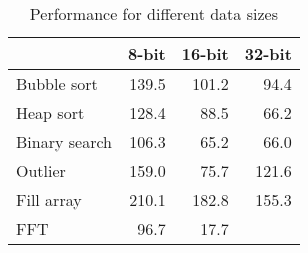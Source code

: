 
\begin{table}
\caption{Performance for different data sizes}
\label{tbl-performance-8-16-32-bit}
    \begin{tabular}{lrrr}
    \toprule
                   &   8-bit  &  16-bit  &     32-bit \\
    \midrule
    \midrule
    Bubble sort    &    139.5 &    101.2 &       94.4 \\
    Heap sort      &    128.4 &     88.5 &       66.2 \\
    Binary search  &    106.3 &     65.2 &       66.0 \\
    Outlier        &    159.0 &     75.7 &      121.6 \\
    Fill array     &    210.1 &    182.8 &      155.3 \\
    FFT            &     96.7 &     17.7 &            \\
    \bottomrule
    \end{tabular}
\end{table}
